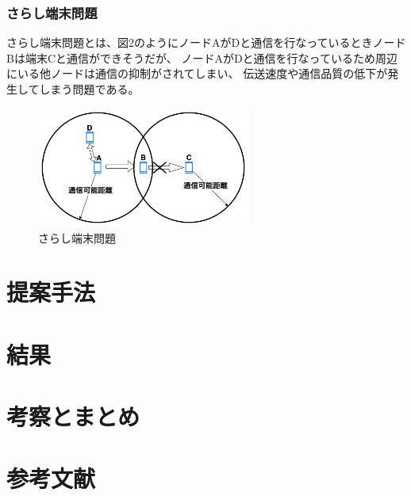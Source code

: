 \documentclass[a4paper, 11pt]{ltjsarticle}
\begin{document}
\subsubsection{さらし端末問題}
さらし端末問題とは、図2のようにノードAがDと通信を行なっているときノードBは端末Cと通信ができそうだが、
ノードAがDと通信を行なっているため周辺にいる他ノードは通信の抑制がされてしまい、
伝送速度や通信品質の低下が発生してしまう問題である。%
\begin{figure}[H]
  \centering
  \includegraphics[width=70mm]{exposed_terminal_problem.png}
  \caption{さらし端末問題}
\end{figure}

\newpage
\section{提案手法}

\newpage
\section{結果}

\newpage
\section{考察とまとめ}

\newpage
\section{参考文献}
\end{document}
